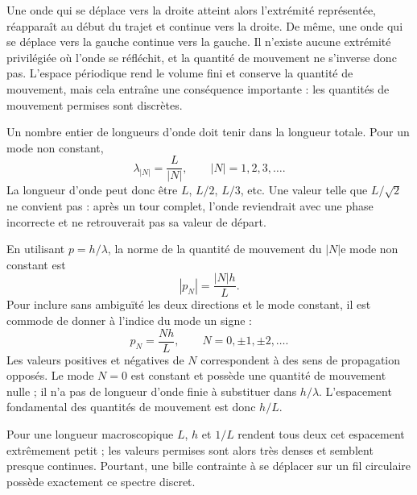 Une onde qui se déplace vers la droite atteint alors l’extrémité représentée, réapparaît au début du trajet et continue vers la droite. De même, une onde qui se déplace vers la gauche continue vers la gauche. Il n’existe aucune extrémité privilégiée où l’onde se réfléchit, et la quantité de mouvement ne s’inverse donc pas. L’espace périodique rend le volume fini et conserve la quantité de mouvement, mais cela entraîne une conséquence importante : les quantités de mouvement permises sont discrètes.

Un nombre entier de longueurs d’onde doit tenir dans la longueur totale. Pour un mode non constant,
\begin{equation}
\lambda_{|N|}=\frac{L}{|N|},
\qquad |N|=1,2,3,\ldots .
\end{equation}
La longueur d’onde peut donc être \(L\), \(L/2\), \(L/3\), etc. Une valeur telle que \(L/\sqrt{2}\) ne convient pas : après un tour complet, l’onde reviendrait avec une phase incorrecte et ne retrouverait pas sa valeur de départ.

En utilisant \(p=h/\lambda\), la norme de la quantité de mouvement du \(|N|\)e mode non constant est
\begin{equation}
|p_N|=\frac{|N|h}{L}.
\end{equation}
Pour inclure sans ambiguïté les deux directions et le mode constant, il est commode de donner à l’indice du mode un signe :
\begin{equation}
p_N=\frac{Nh}{L},
\qquad N=0,\pm1,\pm2,\ldots .
\end{equation}
Les valeurs positives et négatives de \(N\) correspondent à des sens de propagation opposés. Le mode \(N=0\) est constant et possède une quantité de mouvement nulle ; il n’a pas de longueur d’onde finie à substituer dans \(h/\lambda\). L’espacement fondamental des quantités de mouvement est donc \(h/L\).

Pour une longueur macroscopique \(L\), \(h\) et \(1/L\) rendent tous deux cet espacement extrêmement petit ; les valeurs permises sont alors très denses et semblent presque continues. Pourtant, une bille contrainte à se déplacer sur un fil circulaire possède exactement ce spectre discret.

\begin{classroomqa}
\end{classroomqa}


